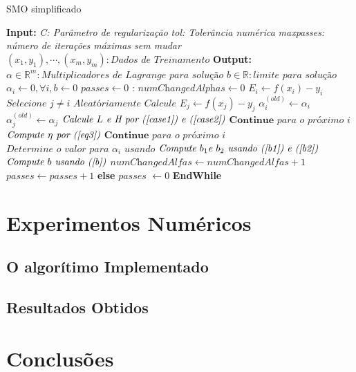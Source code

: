 \documentclass{article}
\begin{document}
\begin{algorithm}[H]
\caption{SMO simplificado}\label{euclid}
\begin{algorithmic}[1]
\State \textbf{Input: }
\State \textit{C: Parâmetro de regularização}
\State \textit{tol: Tolerância numérica}
\State \textit{maxpasses: número de iterações máximas sem mudar}
\State $(x_1,y_1),\cdots,(x_m,y_m): \textit{Dados de Treinamento}$
\State
\State \textbf{Output: }
\State $\alpha\in\mathbb{R}^m:\textit{Multiplicadores de Lagrange para solução}$
\State $ b\in\mathbb{R}: \textit{limite para solução}$
\State
{}
\State $ \alpha_i\gets0,\forall i,b\gets0$
\State $\textit{passes}\gets0$
:
    \State $\textit{numChangedAlphas}\gets 0$
        \State $E_i\gets f(x_i)-y_i$
            \State $\textit{Selecione } j\neq i \textit{ Aleatóriamente}$
            \State $\textit{Calcule } E_j\gets f(x_j)-y_j$
            \State $\alpha_{i}^{(old)}\gets\alpha_i$
            \State $\alpha_{j}^{(old)}\gets\alpha_j$
            \State $\textit{Calcule }L\textit{ e H por (\ref{case1}) e (\ref{case2})}$
                \State $\textbf{Continue }\textit{para o próximo }i$
            \EndIf
            \State $\textit{Compute } \eta \textit{ por (\ref{eq3})}$
                \State $\textbf{Continue }\textit{para o próximo }i$
            \EndIf
            \State $\textit{Determine o valor para }\alpha_i\textit{ usando}$
            \State $\textit{Compute }b_1 \textit{e }b_2\textit{ usando (\ref{b1}) e (\ref{b2})}$
            \State$\textit{Compute }b\textit{ usando (\ref{b})}$
            \State $\textit{numChangedAlfas}\gets\textit{numChangedAlfas}+1$
        \EndIf
    \EndFor
        \State $\textit{passes}\gets\textit{passes}+1$
    \EndIf
    \State\textbf{else}
        \State$\textit{passes }\gets0$
\EndWhile
\State\textbf{EndWhile}
\EndProcedure
\end{algorithmic}
\end{algorithm}


\section{Experimentos Numéricos}
\subsection{O algorítimo Implementado}
\subsection{Resultados Obtidos}

\section{Conclusões}

\printbibliography
\end{document}
